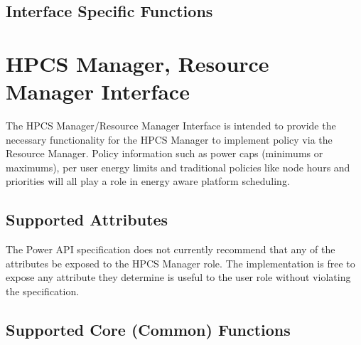\documentclass[12pt]{report} %
\providecommand{\DIFdelbegin}{} %
\providecommand{\DIFdelend}{} %
\newcommand{\DIFscaledelfig}{0.5}
\newlength{\DIFdelgraphicswidth} %
\newlength{\DIFdelgraphicsheight} %
\newcommand{\DIFdelincludegraphics}[2][]{%
\sbox{\DIFdelgraphicsbox}{\DIFOincludegraphics[#1]{#2}}%
\settoboxwidth{\DIFdelgraphicswidth}{\DIFdelgraphicsbox} %
\settoboxtotalheight{\DIFdelgraphicsheight}{\DIFdelgraphicsbox} %
\scalebox{\DIFscaledelfig}{%
\parbox[b]{\DIFdelgraphicswidth}{\usebox{\DIFdelgraphicsbox}\\[-\baselineskip] \rule{\DIFdelgraphicswidth}{0em}}\llap{\resizebox{\DIFdelgraphicswidth}{\DIFdelgraphicsheight}{%
\setlength{\unitlength}{\DIFdelgraphicswidth}%
\begin{picture}(1,1)%
\thicklines\linethickness{2pt} %
{\color[rgb]{1,0,0}\put(0,0){\framebox(1,1){}}}%
{\color[rgb]{1,0,0}\put(0,0){\line( 1,1){1}}}%
{\color[rgb]{1,0,0}\put(0,1){\line(1,-1){1}}}%
\end{picture}%
}\hspace*{3pt}}} %
} %
\DeclareRobustCommand{\DIFdelbegin}{\DIFOdelbegin \let\includegraphics\DIFdelincludegraphics} %
\DeclareRobustCommand{\DIFdelend}{\DIFOaddend \let\includegraphics\DIFOincludegraphics} %
\begin{document}
\subsection{Interface Specific Functions}\label{sec:AdminMCFunctions}



\newpage
\section{HPCS Manager, Resource Manager Interface}\label{sec:MgrRM}
The HPCS Manager/Resource Manager Interface is intended to provide the necessary functionality for the HPCS Manager to implement policy via the Resource Manager.
Policy information such as power caps (minimums or maximums), per user energy limits and traditional policies like node hours and priorities will all play a role in energy aware platform scheduling. 

\DIFdelbegin %

\DIFdelend \subsection{Supported Attributes}\label{sec:MgrRMAttributes}
The Power API specification does not currently recommend that any of the attributes be exposed to the HPCS Manager role. 
The implementation is free to expose any attribute they determine is useful to the user role without violating the specification.

\subsection{Supported Core (Common) Functions}\label{sec:MgrRMSupportedCommon}

\DIFdelbegin %
\end{document}
